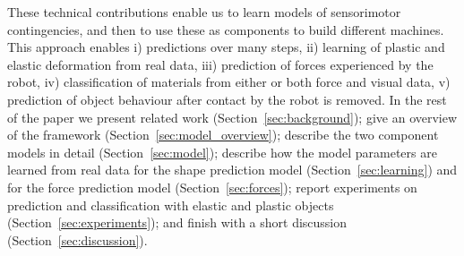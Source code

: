 \documentclass[journal]{IEEEtran}
\newcommand{\alref}[1]{Algorithm~\ref{#1}}
\newcounter{algorithm}
\newenvironment{algorithmicieee}[1]
  {\refstepcounter{algorithm}
   \begin{lrbox}{\ieeealgbox}
   \begin{minipage}{\dimexpr\columnwidth-2\fboxsep-2\fboxrule}
   \textbf{Algorithm \arabic{algorithm}:} \textit{#1} \par
   \begin{algorithmic}[1]}
  {\end{algorithmic}
   \end{minipage}
   \end{lrbox}\noindent\fbox{\usebox{\ieeealgbox}}}
\begin{document}


These technical contributions enable us to learn models of sensorimotor contingencies, and then to use these as components to build different machines. This approach enables i) predictions over many steps, ii) learning of plastic and elastic deformation from real data, iii) prediction of forces experienced by the robot, iv) classification of materials from either or both force and visual data, v) prediction of object behaviour after contact by the robot is removed. In the rest of the paper we present related work (Section~\ref{sec:background}); give an overview of the framework (Section~\ref{sec:model_overview}); describe the two component models in detail (Section~\ref{sec:model}); describe how the model parameters are learned from real data for the shape prediction model (Section~\ref{sec:learning}) and for the force prediction model (Section~\ref{sec:forces}); report experiments on prediction and classification with elastic and plastic objects (Section~\ref{sec:experiments}); and finish with a short discussion (Section~\ref{sec:discussion}).
\end{document}
